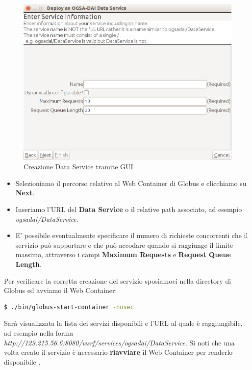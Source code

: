 \documentclass[11pt]{article}
\begin{document}
\begin{figure}[H]
	\centering
	\includegraphics[scale=0.9]{images/guiservice.png}
	\caption{Creazione Data Service tramite GUI}
	\label{guiservice}
\end{figure}


\begin{itemize}
	\item Selezioniamo il percorso relativo al Web Container di Globus e clicchiamo su \textbf{Next}.
	\item Inseriamo l'URL del \textbf{Data Service} o il relative path associato, ad esempio \emph{ogsadai/DataService}.
	\item E' possibile eventualmente specificare il numero di richieste concorrenti che il servizio può supportare e che può accodare quando si raggiunge il limite massimo, attraverso i campi \textbf{Maximum Requests} e \textbf{Request Queue Length}.
\end{itemize}

Per verificare la corretta creazione del servizio sposiamoci nella directory di Globus ed avviamo il Web Container: 

\begin{lstlisting}[language=bash]
$ ./bin/globus-start-container -nosec
\end{lstlisting}

Sarà visualizzata la lista dei servizi disponibili e l'URL al quale è raggiungibile, ad esempio nella forma \emph{http://129.215.56.6:8080/wsrf/services/ogsadai/DataService}. Si noti che una volta creato il servizio è necessario \textbf{riavviare} il Web Container per renderlo disponibile \cite{ogsadai}.
\end{document}
